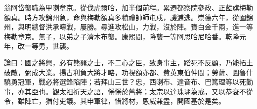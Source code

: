 \begin{pinyinscope}
翁阿岱襲職為甲喇章京。從伐虎爾哈，加半個前程。累遷都察院參政、正藍旗梅勒額真。時方攻錦州急，命與梅勒額真多積禮帥師屯戍，譏逋逃。崇德六年，從圍錦州，與明總督洪承疇戰，屢勝。尋進攻松山，力戰，沒於陣。賚白金千兩，進一等梅勒章京。無子，以弟之子濟木布襲。康熙間，降襲一等阿思哈尼哈番。乾隆元年，改一等男，世襲。

論曰：國之將興，必有熊羆之士，不二心之臣，致身事主，蹈死不反顧，乃能拓土破敵，弼成大業。揚古利負大將才略，功視額亦都、費英東伯仲間；勞薩、圖魯什驍勇冠軍，戰必將選鋒陷陣；若拜山三世？忠，西喇布、達音布、巴篤理等以死勤事，亦其亞也。觀太祖祈天之語，惓惓於舊將；太宗以達珠瑚為戒，又以恭袞不從令，雖陣亡，猶付吏議。其申軍律，惜將材，恩威兼盡，開國基於是矣。


\end{pinyinscope}